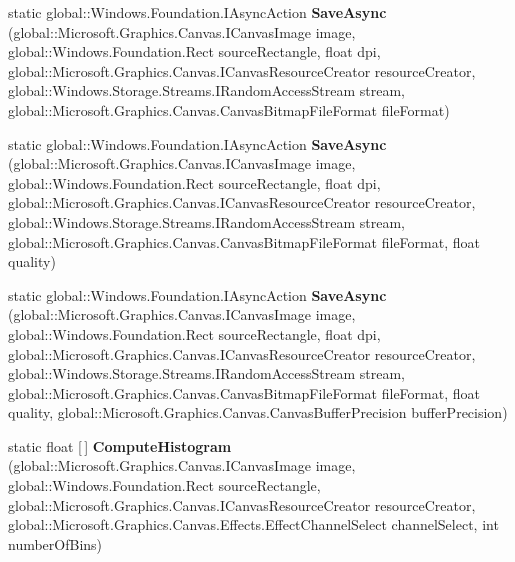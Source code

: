 \begin{DoxyCompactItemize}
static global\+::\+Windows.\+Foundation.\+I\+Async\+Action {\bfseries Save\+Async} (global\+::\+Microsoft.\+Graphics.\+Canvas.\+I\+Canvas\+Image image, global\+::\+Windows.\+Foundation.\+Rect source\+Rectangle, float dpi, global\+::\+Microsoft.\+Graphics.\+Canvas.\+I\+Canvas\+Resource\+Creator resource\+Creator, global\+::\+Windows.\+Storage.\+Streams.\+I\+Random\+Access\+Stream stream, global\+::\+Microsoft.\+Graphics.\+Canvas.\+Canvas\+Bitmap\+File\+Format file\+Format)
\item 
\mbox{\label{class_microsoft_1_1_graphics_1_1_canvas_1_1_canvas_image_a84ddbc832a47bc0660a10d09a095ae1e}} 
static global\+::\+Windows.\+Foundation.\+I\+Async\+Action {\bfseries Save\+Async} (global\+::\+Microsoft.\+Graphics.\+Canvas.\+I\+Canvas\+Image image, global\+::\+Windows.\+Foundation.\+Rect source\+Rectangle, float dpi, global\+::\+Microsoft.\+Graphics.\+Canvas.\+I\+Canvas\+Resource\+Creator resource\+Creator, global\+::\+Windows.\+Storage.\+Streams.\+I\+Random\+Access\+Stream stream, global\+::\+Microsoft.\+Graphics.\+Canvas.\+Canvas\+Bitmap\+File\+Format file\+Format, float quality)
\item 
\mbox{\label{class_microsoft_1_1_graphics_1_1_canvas_1_1_canvas_image_a762e42f02f39504e92616098985cf683}} 
static global\+::\+Windows.\+Foundation.\+I\+Async\+Action {\bfseries Save\+Async} (global\+::\+Microsoft.\+Graphics.\+Canvas.\+I\+Canvas\+Image image, global\+::\+Windows.\+Foundation.\+Rect source\+Rectangle, float dpi, global\+::\+Microsoft.\+Graphics.\+Canvas.\+I\+Canvas\+Resource\+Creator resource\+Creator, global\+::\+Windows.\+Storage.\+Streams.\+I\+Random\+Access\+Stream stream, global\+::\+Microsoft.\+Graphics.\+Canvas.\+Canvas\+Bitmap\+File\+Format file\+Format, float quality, global\+::\+Microsoft.\+Graphics.\+Canvas.\+Canvas\+Buffer\+Precision buffer\+Precision)
\item 
\mbox{\label{class_microsoft_1_1_graphics_1_1_canvas_1_1_canvas_image_ac93dfecc525eae062c86e25f3af30682}} 
static float \mbox{[}$\,$\mbox{]} {\bfseries Compute\+Histogram} (global\+::\+Microsoft.\+Graphics.\+Canvas.\+I\+Canvas\+Image image, global\+::\+Windows.\+Foundation.\+Rect source\+Rectangle, global\+::\+Microsoft.\+Graphics.\+Canvas.\+I\+Canvas\+Resource\+Creator resource\+Creator, global\+::\+Microsoft.\+Graphics.\+Canvas.\+Effects.\+Effect\+Channel\+Select channel\+Select, int number\+Of\+Bins)

\end{DoxyCompactItemize}
